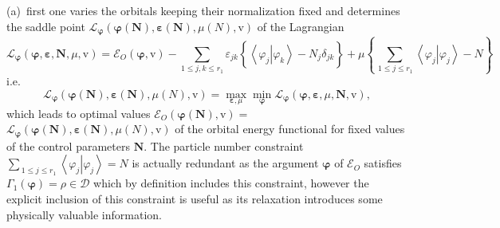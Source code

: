 \documentclass[aps,preprint]{revtex4}%
\begin{document}
(a)\ first one varies the orbitals keeping their normalization fixed and
determines the saddle point $\mathcal{L}_{\boldsymbol{\varphi}}\left(
\boldsymbol{\varphi}\left(  \boldsymbol{N}\right)  ,\boldsymbol{\varepsilon
}\left(  \boldsymbol{N}\right)  ,\mu\left(  N\right)  ,\mathrm{v}\right)  $ of
the Lagrangian
\begin{equation}
\mathcal{L}_{\boldsymbol{\varphi}}\left(  \boldsymbol{\varphi}%
,\boldsymbol{\varepsilon,N,}\mu\boldsymbol{,}\mathrm{v}\right)  =\mathcal{E}%
_{O}\left(  \boldsymbol{\varphi,}\mathrm{v}\right)  -\sum_{1\leq j,k\leq
r_{1}}\varepsilon_{jk}\left\{  \overset{\,}{\left\langle \left.  \varphi
_{j}\right\vert \varphi_{k}\right\rangle -N_{j}\delta_{jk}}\right\}
+\mu\left\{  \sum_{\,1\leq j\leq r_{1}}\left\langle \left.  \varphi
_{j}\right\vert \varphi_{j}\right\rangle -N\right\}
\end{equation}
i.e.
\begin{equation}
\mathcal{L}_{\boldsymbol{\varphi}}\left(  \boldsymbol{\varphi}\left(
\boldsymbol{N}\right)  ,\boldsymbol{\varepsilon}\left(  \boldsymbol{N}\right)
,\mu\left(  N\right)  ,\mathrm{v}\right)  =\max_{\boldsymbol{\varepsilon,}\mu
}\min_{\boldsymbol{\varphi}}\mathcal{L}_{\boldsymbol{\varphi}}\left(
\boldsymbol{\varphi},\boldsymbol{\varepsilon},\mu\boldsymbol{,N,}%
\mathrm{v}\right)  , \label{KSM1}%
\end{equation}
which leads to optimal values $\mathcal{E}_{O}\left(  \boldsymbol{\varphi
}\left(  \boldsymbol{N}\right)  \boldsymbol{,}\mathrm{v}\right)  =$
$\mathcal{L}_{\boldsymbol{\varphi}}\left(  \boldsymbol{\varphi}\left(
\boldsymbol{N}\right)  ,\boldsymbol{\varepsilon}\left(  \boldsymbol{N}\right)
,\mu\left(  N\right)  \boldsymbol{,}\mathrm{v}\right)  $ of the orbital energy
functional for fixed values of the control parameters $\boldsymbol{N}$. The
particle number constraint $\sum_{\,1\leq j\leq r_{1}}\left\langle \left.
\varphi_{j}\right\vert \varphi_{j}\right\rangle =N$ is actually redundant as
the argument $\boldsymbol{\varphi}$ of $\mathcal{E}_{O}$ satisfies $\Gamma
_{1}\left(  \boldsymbol{\varphi}\right)  =\rho\in\mathcal{D}$ which by
definition includes this constraint, however the explicit inclusion of this
constraint is useful as its relaxation introduces some physically valuable information.
\end{document}
